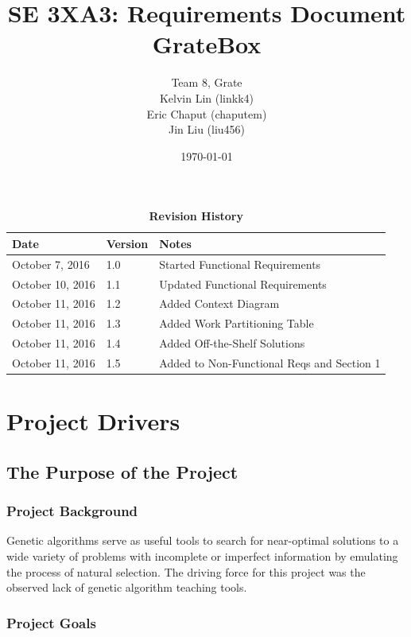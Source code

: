 \documentclass[12pt, titlepage]{article}
\title{SE 3XA3: Requirements Document\\GrateBox}
\author{Team 8, Grate
		\\ Kelvin Lin (linkk4)
		\\ Eric Chaput (chaputem)
		\\ Jin Liu (liu456)
}
\date{\today}
\begin{document}
\maketitle

\tableofcontents
\listoftables
\listoffigures

\begin{table}[h]
\caption{\bf Revision History}
\begin{tabularx}{\textwidth}{p{3.5cm}p{2cm}X}
\toprule {\bf Date} & {\bf Version} & {\bf Notes}\\
\midrule
October 7, 2016 & 1.0 & Started Functional Requirements\\
October 10, 2016 & 1.1 & Updated Functional Requirements\\
October 11, 2016 & 1.2 & Added Context Diagram\\
October 11, 2016 & 1.3 & Added Work Partitioning Table\\
October 11, 2016 & 1.4 & Added Off-the-Shelf Solutions\\
October 11, 2016 & 1.5 & Added to Non-Functional Reqs and Section 1\\
\bottomrule
\end{tabularx}
\end{table}

\newpage


\section{Project Drivers}

\subsection{The Purpose of the Project}

\subsubsection{Project Background}

Genetic algorithms serve as useful tools to search for near-optimal solutions to 
a wide variety of problems with incomplete or imperfect information by emulating 
the process of natural selection. The driving force for this project was the 
observed lack of genetic algorithm teaching tools. 

\subsubsection{Project Goals}
\end{document}
